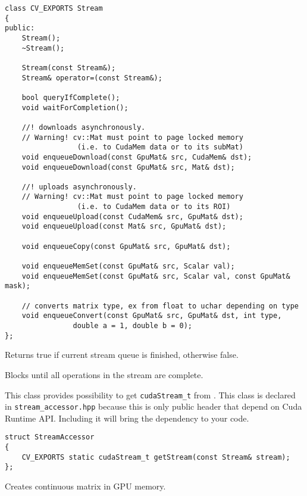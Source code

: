 \begin{lstlisting}
class CV_EXPORTS Stream
{
public:
	Stream();
	~Stream();

	Stream(const Stream&);
	Stream& operator=(const Stream&);

	bool queryIfComplete();
	void waitForCompletion();

	//! downloads asynchronously.
	// Warning! cv::Mat must point to page locked memory
                 (i.e. to CudaMem data or to its subMat)
	void enqueueDownload(const GpuMat& src, CudaMem& dst);
	void enqueueDownload(const GpuMat& src, Mat& dst);

	//! uploads asynchronously.
	// Warning! cv::Mat must point to page locked memory 
                 (i.e. to CudaMem data or to its ROI)
	void enqueueUpload(const CudaMem& src, GpuMat& dst);
	void enqueueUpload(const Mat& src, GpuMat& dst);

	void enqueueCopy(const GpuMat& src, GpuMat& dst);

	void enqueueMemSet(const GpuMat& src, Scalar val);
	void enqueueMemSet(const GpuMat& src, Scalar val, const GpuMat& mask);

	// converts matrix type, ex from float to uchar depending on type
	void enqueueConvert(const GpuMat& src, GpuMat& dst, int type, 
                double a = 1, double b = 0);
};

\end{lstlisting}

Returns true if current stream queue is finished, otherwise false.

Blocks until all operations in the stream are complete.



This class provides possibility to get \texttt{cudaStream\_t} from . This class is declared in \texttt{stream\_accessor.hpp} because this is only public header that depend on Cuda Runtime API. Including it will bring the dependency to your code.

\begin{lstlisting}
struct StreamAccessor
{
	CV_EXPORTS static cudaStream_t getStream(const Stream& stream);
};
\end{lstlisting}

Creates continuous matrix in GPU memory.

